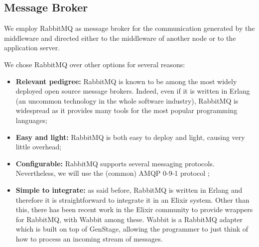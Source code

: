 \subsection{Message Broker}
We employ RabbitMQ as message broker
for the communication generated by the middleware and directed either to
the middleware of another node or to the application server.

We chose RabbitMQ over other options for several reasons:
\begin{itemize}
  \item \textbf{Relevant pedigree:} RabbitMQ is known to be among the
        most widely deployed open source message brokers. Indeed, even if it
        is written in Erlang (an uncommon technology in
        the whole software industry), RabbitMQ is widespread as it provides
        many tools for the most popular programming languages;
  \item \textbf{Easy and light:} RabbitMQ is both easy to deploy and light,
    causing very little overhead;
  \item \textbf{Configurable:} RabbitMQ supports several messaging protocols.
        Nevertheless, we will use the (common) AMQP 0-9-1 protocol
        \cite{vinoski2006advanced};
  \item \textbf{Simple to integrate:} as said before, RabbitMQ is written in
        Erlang and therefore it is straightforward to integrate it in an Elixir
        system.
        Other than this, there has been recent work in the Elixir community to
        provide wrappers for RabbitMQ, with Wabbit among these. Wabbit
        is a RabbitMQ adapter which is built on top of GenStage, allowing the
        programmer to just think of how to process an incoming stream of
        messages.
\end{itemize}
